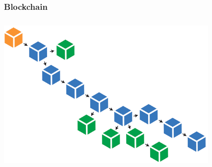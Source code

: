 \documentclass{beamer}
\begin{document}
\begin{frame}
\frametitle{Blockchain}
\includegraphics[width=11cm, height=8cm]{blockchain2}
\end{frame}
\end{document}
